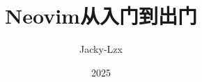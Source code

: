 \documentclass[17pt]{ctexbeamer}
\title{Neovim从入门到出门}
\author{Jacky-Lzx}
\date{2025}
\begin{document}
\begin{frame}
  \titlepage
\end{frame}
\end{document}
